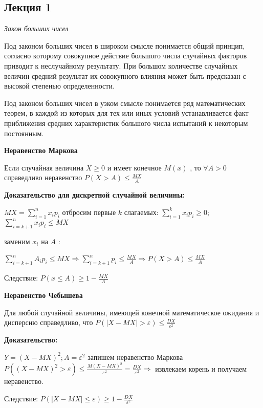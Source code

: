 \subsection{Лекция 1}

\textit{Закон больших чисел}

Под законом больших чисел в широком смысле понимается общий принцип, согласно которому совокупное действие большого числа случайных факторов приводит к неслучайному результату.
При большом количестве случайных величин средний результат их совокупного влияния может быть предсказан с высокой степенью определенности.

Под законом больших чисел в узком смысле понимается ряд математических теорем, в каждой из которых для тех или иных условий устанавливается факт приближения средних характеристик большого числа испытаний к некоторым постоянным.

\begin{center}
    \textbf{Неравенство Маркова}
\end{center} 

Если случайная величина $X \ge 0$ и имеет конечное $M(x)$ , то $\forall A > 0$ справедливо неравенство $P(X>A) \le \frac{MX}{A}$

\textbf{Доказательство для дискретной случайной величины: }

$ MX=\sum \limits_{i=1}^{n}{x_i p_i} $ отбросим первые $k$ слагаемых: $ \sum \limits_{i=1}^{k}{x_i p_i} \ge 0 $; $ \sum \limits_{i=k+1}^{n}{x_i p_i} \le MX $ 

заменим $x_i$ на $A$ :

$ \sum \limits_{i=k+1}^{n}{A_i p_i} \le MX \Rightarrow \sum \limits_{i=k+1}^{n}{p_i} \le \frac{MX}{A} \Rightarrow P(X>A) \le \frac{MX}{A} $\

Следствие: $P(x \le A) \ge 1 - \frac{MX}{A}$

\begin{center}
    \textbf{Неравенство Чебышева}
\end{center} 

Для любой случайной величины, имеющей конечной математическое ожидания и дисперсию справедливо, что $P(|X-MX|>\varepsilon) \le \frac{DX}{\varepsilon^2}$

\textbf{Доказательство: }

$Y=(X-MX)^2;A=\varepsilon^2$ запишем неравенство Маркова $P((X-MX)^2 > \varepsilon) \le \frac{M(X-MX)^2}{\varepsilon^2} = \frac{DX}{\varepsilon^2} \Rightarrow$ извлекаем корень и получаем неравенство.

Следствие: $P(|X-MX| \le \varepsilon) \ge 1 - \frac{DX}{\varepsilon^2}$

